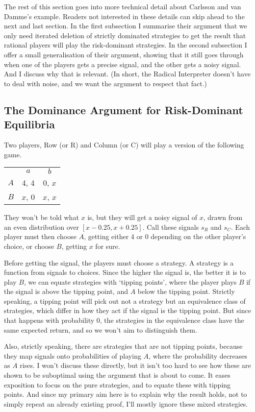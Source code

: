 \documentclass[11pt,]{book}
\def\toprule{}
\def\bottomrule{}
\begin{document}
The rest of this section goes into more technical detail about Carlsson and van Damme's example. Readers not interested in these details can skip ahead to the next and last section. In the first subsection I summarise their argument that we only need iterated deletion of strictly dominated strategies to get the result that rational players will play the risk-dominant strategies. In the second subsection I offer a small generalisation of their argument, showing that it still goes through when one of the players gets a precise signal, and the other gets a noisy signal. And I discuss why that is relevant. (In short, the Radical Interpreter doesn't have to deal with noise, and we want the argument to respect that fact.)

\hypertarget{cvdproof}{%
\subsection{The Dominance Argument for Risk-Dominant Equilibria}\label{cvdproof}}

Two players, Row (or R) and Column (or C) will play a version of the following game.

\begin{longtable}[]{@{}lcc@{}}
\toprule
\endhead
& \(a\) & \(b\)\tabularnewline
\(A\) & 4, 4 & 0, \(x\)\tabularnewline
\(B\) & \(x\), 0 & \(x\), \(x\)\tabularnewline
\bottomrule
\end{longtable}

They won't be told what \(x\) is, but they will get a noisy signal of \(x\), drawn from an even distribution over \([x - 0.25, x + 0.25]\). Call these signals \(s_R\) and \(s_C\). Each player must then choose \(A\), getting either 4 or 0 depending on the other player's choice, or choose \(B\), getting \(x\) for sure.

Before getting the signal, the players must choose a strategy. A strategy is a function from signals to choices. Since the higher the signal is, the better it is to play \(B\), we can equate strategies with `tipping points', where the player plays \(B\) if the signal is above the tipping point, and \(A\) below the tipping point. Strictly speaking, a tipping point will pick out not a strategy but an equivalence class of strategies, which differ in how they act if the signal is the tipping point. But since that happens with probability 0, the strategies in the equivalence class have the same expected return, and so we won't aim to distinguish them.

Also, strictly speaking, there are strategies that are not tipping points, because they map signals onto probabilities of playing \(A\), where the probability decreases as \(A\) rises. I won't discuss these directly, but it isn't too hard to see how these are shown to be suboptimal using the argument that is about to come. It eases exposition to focus on the pure strategies, and to equate these with tipping points. And since my primary aim here is to explain why the result holds, not to simply repeat an already existing proof, I'll mostly ignore these mixed strategies.
\end{document}
